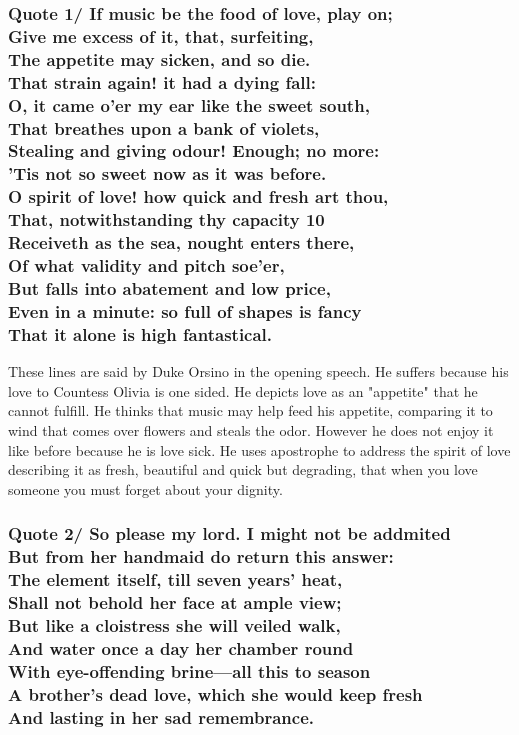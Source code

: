 \documentclass[12pt, a4paper]{article}
\begin{document}
\subsubsection*{Quote 1/
  If music be the food of love, play on;\\
	Give me excess of it, that, surfeiting,\\
	The appetite may sicken, and so die.\\
	That strain again! it had a dying fall:\\
	O, it came o'er my ear like the sweet south,\\
	That breathes upon a bank of violets,\\
	Stealing and giving odour! Enough; no more:\\
	'Tis not so sweet now as it was before.\\
	O spirit of love! how quick and fresh art thou,\\
	That, notwithstanding thy capacity	10\\
	Receiveth as the sea, nought enters there,\\
	Of what validity and pitch soe'er,\\
	But falls into abatement and low price,\\
	Even in a minute: so full of shapes is fancy\\
	That it alone is high fantastical.
}
These lines are said by Duke Orsino  in the opening speech. He suffers because
his love to Countess Olivia is one sided. He depicts love as an "appetite" that
he cannot fulfill. He thinks that music may help feed his appetite, comparing
it to wind that comes over flowers and steals the odor. However he does not
enjoy it like before because he is love sick. He uses apostrophe to address the spirit of love
describing it as fresh, beautiful and quick but degrading, that when you
love someone you must forget about your dignity.

\subsubsection*{Quote 2/ 
  So please my lord. I might not be addmited\\ 
  But from her handmaid do return this answer:\\
  The element itself, till seven years' heat, \\
  Shall not behold her face at ample view;\\ 
  But like a cloistress she will veiled walk,\\ 
  And water once a day her chamber round \\ 
  With eye-offending brine---all this to season\\
  A brother's dead love, which she would keep fresh\\
  And lasting in her sad remembrance.
}
\end{document}
